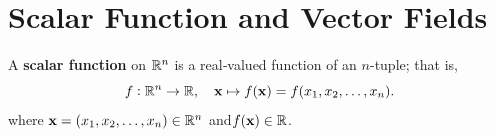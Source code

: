 \documentclass[11pt,openany]{article}
\renewcommand{\vec}[1]{\mathbf{#1}}
\renewcommand{\emph}[1]{\textbf{#1}}
\begin{document}
\section*{Scalar Function and Vector Fields}
A \textbf{scalar function} on \(\mathbb{R}^n\) is a real‑valued function of an \(n\)-tuple; that is,
\[
f:\R^n\to\R,\quad\vec{x}\mapsto f(\vec{x})=f(x_1,x_2,\dots,x_n).
\] where \(\vec{x}=(x_1,x_2,\dots,x_n)\in\R^n\) and\(f(\vec{x})\in\R\).
%
%
%
%
%
%
%
%
%
%
%	
%	
%	
\end{document}
